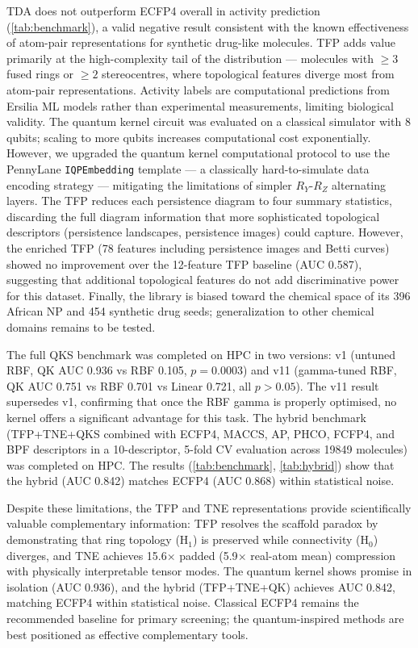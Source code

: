 \documentclass[11pt,a4paper]{article}
\begin{document}
TDA does not outperform ECFP4 overall in activity prediction (\cref{tab:benchmark}), a valid negative result consistent with the known effectiveness of atom-pair representations for synthetic drug-like molecules. TFP adds value primarily at the high-complexity tail of the distribution --- molecules with $\geq 3$ fused rings or $\geq 2$ stereocentres, where topological features diverge most from atom-pair representations. Activity labels are computational predictions from Ersilia ML models rather than experimental measurements, limiting biological validity. The quantum kernel circuit was evaluated on a classical simulator with 8 qubits; scaling to more qubits increases computational cost exponentially. However, we upgraded the quantum kernel computational protocol to use the PennyLane \texttt{IQPEmbedding} template --- a classically hard-to-simulate data encoding strategy --- mitigating the limitations of simpler $R_Y$-$R_Z$ alternating layers. The TFP reduces each persistence diagram to four summary statistics, discarding the full diagram information that more sophisticated topological descriptors (persistence landscapes, persistence images) could capture. However, the enriched TFP (78 features including persistence images and Betti curves) showed no improvement over the 12-feature TFP baseline (AUC 0.587), suggesting that additional topological features do not add discriminative power for this dataset. Finally, the library is biased toward the chemical space of its 396 African NP and 454 synthetic drug seeds; generalization to other chemical domains remains to be tested.

The full QKS benchmark was completed on HPC in two versions: v1 (untuned RBF, QK AUC 0.936 vs RBF 0.105, $p = \num{0.0003}$) and v11 (gamma-tuned RBF, QK AUC 0.751 vs RBF 0.701 vs Linear 0.721, all $p > \num{0.05}$). The v11 result supersedes v1, confirming that once the RBF gamma is properly optimised, no kernel offers a significant advantage for this task. The hybrid benchmark (TFP+TNE+QKS combined with ECFP4, MACCS, AP, PHCO, FCFP4, and BPF descriptors in a \num{10}-descriptor, \num{5}-fold CV evaluation across \num{19849} molecules) was completed on HPC. The results (\cref{tab:benchmark}, \cref{tab:hybrid}) show that the hybrid (AUC 0.842) matches ECFP4 (AUC 0.868) within statistical noise.

Despite these limitations, the TFP and TNE representations provide scientifically valuable complementary information: TFP resolves the scaffold paradox by demonstrating that ring topology (H$_1$) is preserved while connectivity (H$_0$) diverges, and TNE achieves \num{15.6}$\times$ padded (\num{5.9}$\times$ real-atom mean) compression with physically interpretable tensor modes. The quantum kernel shows promise in isolation (AUC 0.936), and the hybrid (TFP+TNE+QK) achieves AUC 0.842, matching ECFP4 within statistical noise. Classical ECFP4 remains the recommended baseline for primary screening; the quantum-inspired methods are best positioned as effective complementary tools.
\end{document}
